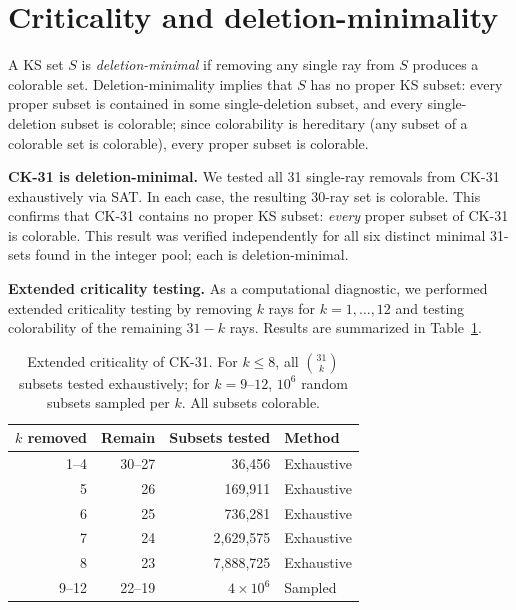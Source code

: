 \documentclass[twocolumn,pra,superscriptaddress,nofootinbib]{revtex4-2}
\begin{document}
\section{Criticality and deletion-minimality}
\label{sec:criticality}

A KS set $S$ is \emph{deletion-minimal} if removing any single ray from $S$ produces a colorable set. Deletion-minimality implies that $S$ has no proper KS subset: every proper subset is contained in some single-deletion subset, and every single-deletion subset is colorable; since colorability is hereditary (any subset of a colorable set is colorable), every proper subset is colorable.

\textbf{CK-31 is deletion-minimal.} We tested all 31 single-ray removals from CK-31 exhaustively via SAT. In each case, the resulting 30-ray set is colorable. This confirms that CK-31 contains no proper KS subset: \emph{every} proper subset of CK-31 is colorable. This result was verified independently for all six distinct minimal 31-sets found in the integer pool; each is deletion-minimal.

\textbf{Extended criticality testing.} As a computational diagnostic, we performed extended criticality testing by removing $k$ rays for $k = 1, \ldots, 12$ and testing colorability of the remaining $31 - k$ rays. Results are summarized in Table~\ref{tab:criticality}.

\begin{table}[t]
\centering
\caption{Extended criticality of CK-31. For $k \leq 8$, all $\binom{31}{k}$ subsets tested exhaustively; for $k = 9$--$12$, $10^6$ random subsets sampled per $k$. All subsets colorable.}
\label{tab:criticality}
\begin{tabular}{rrrl}
\toprule
$k$ removed & Remain & Subsets tested & Method \\
\midrule
1--4 & 30--27 & 36{,}456 & Exhaustive \\
5 & 26 & 169{,}911 & Exhaustive \\
6 & 25 & 736{,}281 & Exhaustive \\
7 & 24 & 2{,}629{,}575 & Exhaustive \\
8 & 23 & 7{,}888{,}725 & Exhaustive \\
9--12 & 22--19 & $4 \times 10^6$ & Sampled \\
\bottomrule
\end{tabular}
\end{table}
\end{document}
